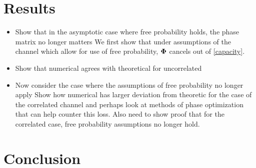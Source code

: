 \documentclass[12pt,a4paper]{report}
\begin{document}
\chapter{Results}\label{Results}
\begin{itemize}
\item 
	Show that in the asymptotic case where free probability holds, the phase matrix no longer matters
	We first show that under assumptions of the channel which allow for use of free probability, $\boldsymbol{\Phi}$
	cancels out of \eqref{capacity}.
	
\item
	Show that numerical agrees with theoretical for uncorrelated 
\item
	Now consider the case where the assumptions of free probability no longer apply 
	Show how numerical has larger deviation from theoretic for the case of the correlated channel and perhaps 
	look at methods of phase optimization that can help counter this loss. Also need to show proof that for the
	correlated case, free probability assumptions no longer hold. 
\end{itemize}



\chapter{Conclusion}


\end{document}

